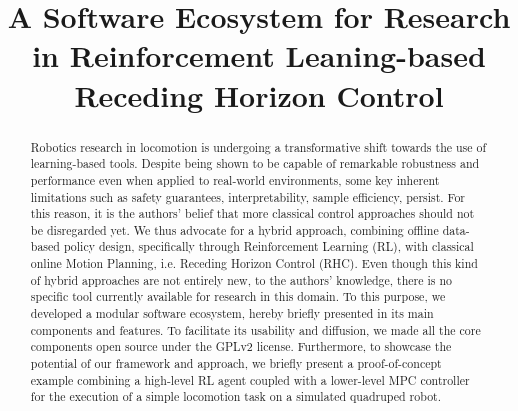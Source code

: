 \documentclass[letterpaper, 10 pt, conference]{ieeeconf}  %
\begin{document}
	
\title{\LARGE \bf
A Software Ecosystem for Research in Reinforcement Leaning-based Receding Horizon Control
}

\author{
}

\maketitle

\begingroup\renewcommand{}
\endgroup

\begingroup\renewcommand{}
\endgroup

\setlength{\textfloatsep}{12.0pt plus 8.0pt minus .0pt}

\begin{abstract}
Robotics research in locomotion is undergoing a transformative shift towards the use of learning-based tools. Despite being shown to be capable of remarkable robustness and performance even when applied to real-world environments, some key inherent limitations such as safety guarantees, interpretability, sample efficiency, persist. For this reason, it is the authors' belief that more classical control approaches should not be disregarded yet. We thus advocate for a hybrid approach, combining offline data-based policy design, specifically through Reinforcement Learning (RL), with classical online Motion Planning, i.e. Receding Horizon Control (RHC). Even though this kind of hybrid approaches are not entirely new, to the authors' knowledge, there is no specific tool currently available for research in this domain. To this purpose, we developed a modular software ecosystem, hereby briefly presented in its main components and features. 
To facilitate its usability and diffusion, we made all the core components open source under the GPLv2 license. Furthermore, to showcase the potential of our framework and approach, we briefly present a proof-of-concept example combining a high-level RL agent coupled with a lower-level MPC controller for the execution of a simple locomotion task on a simulated quadruped robot.
\end{abstract}

\IEEEpeerreviewmaketitle


%
%




\clearpage


\end{document}
